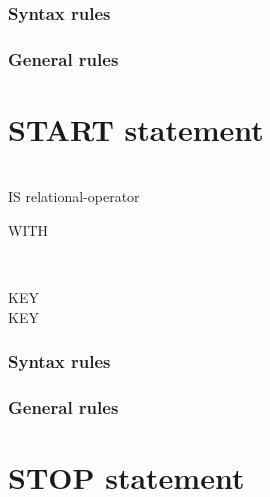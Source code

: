 \subsubsection{Syntax rules}

\subsubsection{General rules}

\section{START statement}

\begin{syntax}
   \filename
  \begin{0-1}
     \\

     IS
    relational-operator
    \identifier\\

  \end{0-1}

  \begin{0-1}
    WITH
    \begin{1=}
       \\
    \end{1=}
    \arithmeticexpression
  \end{0-1}

  \begin{0+}
     KEY \imperativestatement \\
      KEY \imperativestatement
  \end{0+}

  \begin{0-1}
  \end{0-1}
\end{syntax}

\subsubsection{Syntax rules}

\subsubsection{General rules}

\section{STOP statement}

